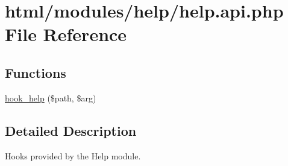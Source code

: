\hypertarget{help_8api_8php}{
\section{html/modules/help/help.api.php File Reference}
\label{help_8api_8php}
}
\subsection*{Functions}
\begin{DoxyCompactItemize}
\item 
\hyperlink{group__hooks_ga5589c2714a782738e8851c4c90231f0e}{hook\_\-help} (\$path, \$arg)
\end{DoxyCompactItemize}


\subsection{Detailed Description}
Hooks provided by the Help module. 